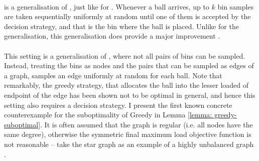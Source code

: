 \paragraph{\KThinning}

\KThinning is a generalisation of \TwoThinning, just like \KChoice for \TwoChoice. Whenever a ball arrives, up to $k$ bin samples are taken sequentially uniformly at random until one of them is accepted by the decision strategy, and that is the bin where the ball is placed. Unlike for the \KChoice generalisation, this generalisation does provide a major improvement \cite{feldheim2020dthinning} \cite{los2021quantilethreshold}.


\paragraph{\GraphicalTwoChoice}

This setting is a generalisation of \TwoChoice, where not all pairs of bins can be sampled. Instead, treating the bins as nodes and the pairs that can be sampled as edges of a graph, \GraphicalTwoChoice samples an edge uniformly at random for each ball. Note that remarkably, the greedy strategy, that allocates the ball into the lesser loaded of endpoint of the edge has been shown not to be optimal in general, and hence this setting also requires a decision strategy. I present the first known concrete counterexample for the suboptimality of Greedy in Lemma \ref{lemma: greedy-suboptimal}. It is often assumed that the graph is regular (i.e. all nodes have the same degree), otherwise the symmetric final maximum load objective function is not reasonable -- take the star graph as an example of a highly unbalanced graph  .

